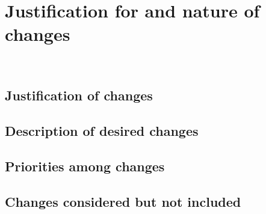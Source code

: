 \chapter{Justification for and nature of changes \\
\label{Chapter::Justification for and nature of changes}}\



\section{Justification of changes  \label{Section::Justification of changes} }



\section{Description of desired changes \label{Section::Description of desired changes}}



\section{Priorities among changes \label{Section::Priorities among changes}}




\section{Changes considered but not included \label{Section::Changes considered but not included}}



